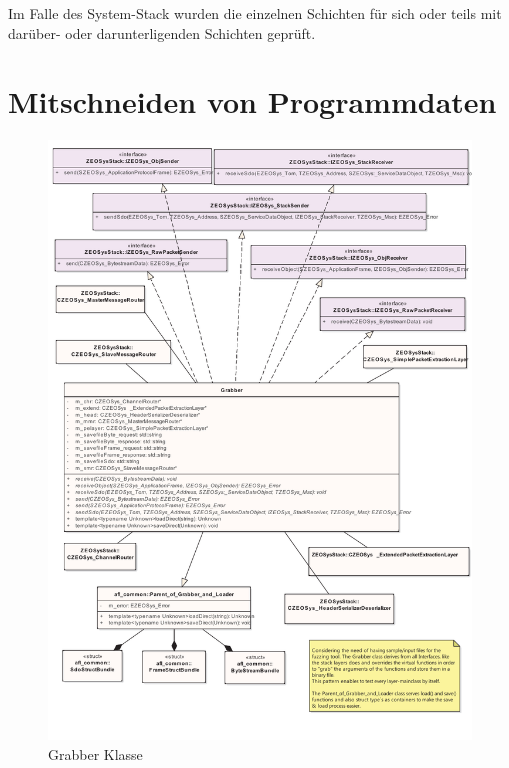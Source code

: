 \documentclass[12pt,a4paper]{scrreprt}
\begin{document}
Im Falle des System-Stack wurden die einzelnen Schichten für sich oder teils mit darüber- oder darunterligenden Schichten geprüft. 



\newpage
\section{Mitschneiden von Programmdaten}

\begin{figure}[htbp] 
  \centering
     \includegraphics[width=1.0\textwidth]{generate.pdf}
  \caption{Grabber Klasse}
  \label{fig:Bild1}
\end{figure}
\end{document}
